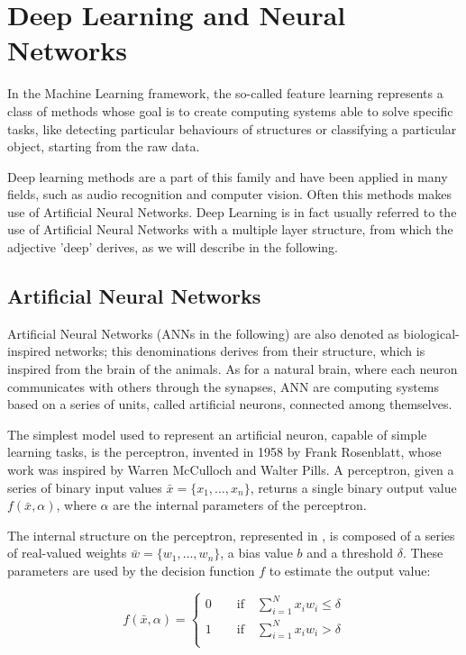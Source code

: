 \chapter{Deep Learning and Neural Networks}

In the Machine Learning framework, the so-called feature learning represents a class of methods whose goal is to create computing systems able to solve specific tasks, like detecting particular behaviours of structures or classifying a particular object, starting from the raw data.

Deep learning methods\cite{deeplearningbook,deep_method} are a part of this family and have been applied in many fields, such as audio recognition\cite{deep_audio} and computer vision\cite{computer_vision1, computer_vision2}. Often this methods makes use of Artificial Neural Networks. Deep Learning is in fact usually referred to the use of Artificial Neural Networks with a multiple layer structure, from which the adjective 'deep' derives, as we will describe in the following. 

\section{Artificial Neural Networks}

Artificial Neural Networks (ANNs in the following) are also denoted as biological-inspired networks; this denominations derives from their structure, which is inspired from  the brain of the animals. As for a natural brain, where each neuron communicates with others through the synapses, ANN are computing systems based on a series of units, called artificial neurons, connected among themselves. 

The simplest model used to represent an artificial neuron, capable of simple learning tasks, is the perceptron, invented in 1958 by Frank Rosenblatt\cite{perceptron}, whose work was inspired by Warren McCulloch and Walter Pills\cite{nielsen}. A perceptron, given a series of binary input values $\bar{x}=\{x_1,\dots, x_n\}$, returns a single binary output value $f(\bar{x}, \alpha)$, where $\alpha$ are the internal parameters of the perceptron. 

The internal structure on the perceptron, represented in , is composed of a series of real-valued weights $\bar{w}=\{w_1,\dots,w_n\}$, a bias value $b$ and a threshold $\delta$. These parameters are used by the decision function $f$ to estimate the output value:

\begin{equation}
f(\bar{x},\alpha) = 
\begin{cases}
0\qquad\text{if}\quad\sum_{i=1}^N x_iw_i \leq \delta \\
1\qquad\text{if}\quad\sum_{i=1}^N x_iw_i > \delta \\
\end{cases}
\end{equation}

